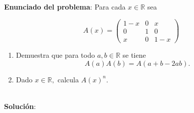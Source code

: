 \documentclass{article} %
\begin{document}
\section{}

\textbf{Enunciado del problema}: Para cada $x \in \mathbb{R}$ sea 

$$A(x)=\left(\begin{array}{ccc}
1-x & 0 & x \\
0 & 1 & 0 \\
x & 0 & 1-x
\end{array}\right)$$

\begin{enumerate}[label=(\alph*)]
\item Demuestra que para todo $a, b \in \mathbb{R}$ se tiene
\[
A(a) A(b)=A(a+b-2 a b).
\]
\item Dado $x \in \mathbb{R},$ calcula $A(x)^{n}$.
\end{enumerate}

\\
\vspace{10 mm}
\textbf{Solución}:


				

\end{document}
